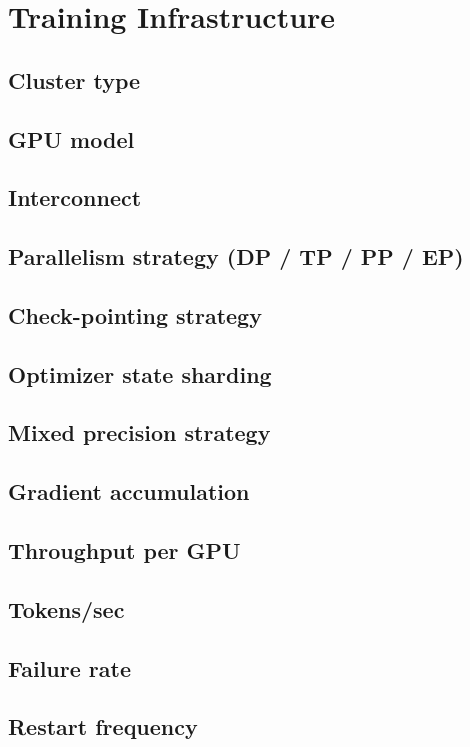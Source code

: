 \section{Training Infrastructure}

\subsection{Cluster type}
\subsection{GPU model}
\subsection{Interconnect}
\subsection{Parallelism strategy (DP / TP / PP / EP)}
\subsection{Check-pointing strategy}
\subsection{Optimizer state sharding}
\subsection{Mixed precision strategy}
\subsection{Gradient accumulation}
\subsection{Throughput per GPU}
\subsection{Tokens/sec}
\subsection{Failure rate}
\subsection{Restart frequency}
